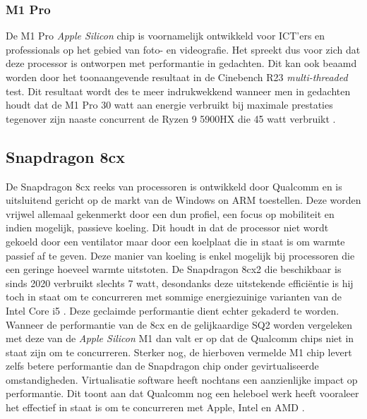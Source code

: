 \subsubsection{M1 Pro}
\raggedbottom
De M1 Pro \textit{Apple Silicon} chip is voornamelijk ontwikkeld voor ICT'ers en professionals op het gebied van foto- en videografie. Het spreekt dus voor zich dat deze processor is ontworpen met performantie in gedachten. Dit kan ook beaamd worden door het toonaangevende resultaat in de Cinebench R23 \textit{multi-threaded} test. Dit resultaat wordt des te meer indrukwekkend wanneer men in gedachten houdt dat de M1 Pro 30 watt aan energie verbruikt bij maximale prestaties tegenover zijn naaste concurrent de Ryzen 9 5900HX die 45 watt verbruikt \autocite{Schiesser2021}.

\subsection{Snapdragon 8cx}
\raggedbottom
De Snapdragon 8cx reeks van processoren is ontwikkeld door Qualcomm en is uitsluitend gericht op de markt van de Windows on ARM toestellen. Deze worden vrijwel allemaal gekenmerkt door een dun profiel, een focus op mobiliteit en indien mogelijk, passieve koeling. Dit houdt in dat de processor niet wordt gekoeld door een ventilator maar door een koelplaat die in staat is om warmte passief af te geven. Deze manier van koeling is enkel mogelijk bij processoren die een geringe hoeveel warmte uitstoten. De Snapdragon 8cx2 die beschikbaar is sinds 2020 verbruikt slechts 7 watt, desondanks deze uitstekende efficiëntie is hij toch in staat om te concurreren met sommige energiezuinige varianten van de Intel Core i5 \autocite{Qualcomm2020}. Deze geclaimde performantie dient echter gekaderd te worden. Wanneer de performantie van de 8cx en de gelijkaardige SQ2 worden vergeleken met deze van de \textit{Apple Silicon} M1 dan valt er op dat de Qualcomm chips niet in staat zijn om te concurreren. Sterker nog, de hierboven vermelde M1 chip levert zelfs betere performantie dan de Snapdragon chip onder gevirtualiseerde omstandigheden. Virtualisatie software heeft nochtans een aanzienlijke impact op performantie. Dit toont aan dat Qualcomm nog een heleboel werk heeft vooraleer het effectief in staat is om te concurreren met Apple, Intel en AMD \autocite{Wankhede2020}.


